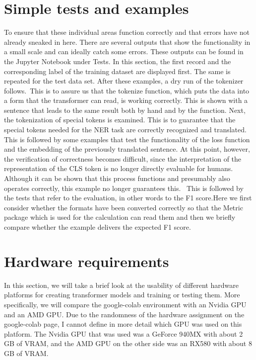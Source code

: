 \section{Simple tests and examples}
To ensure that these individual areas function correctly and that errors have not already sneaked in here. There are several outputs that show the functionality in a small scale and can ideally catch some errors. These outputs can be found in the Jupyter Notebook under Tests. In this section, the first record and the corresponding label of the training dataset are displayed first. The same is repeated for the test data set. After these examples, a dry run of the tokenizer follows. This is to assure us that the tokenize function, which puts the data into a form that the transformer can read, is working correctly. This is shown with a sentence that leads to the same result both by hand and by the function.  Next, the tokenization of special tokens is examined. This is to guarantee that the special tokens needed for the NER task are correctly recognized and translated. This is followed by some examples that test the functionality of the loss function and the embedding of the previously translated sentence. At this point, however, the verification of correctness becomes difficult, since the interpretation of the representation of the CLS token is no longer directly evaluable for humans. Although it can be shown that this process functions and presumably also operates correctly, this example no longer guarantees this.  This is followed by the tests that refer to the evaluation, in other words to the F1 score.Here we first consider whether the formats have been converted correctly so that the Metric package which is used for the calculation can read them and then we briefly compare whether the example delivers the expected F1 score. 

\section{Hardware requirements}
In this section, we will take a brief look at the usability of different hardware platforms for creating transformer models and training or testing them. More specifically, we will compare the google-colab environment with an Nvidia GPU and an AMD GPU. Due to the randomness of the hardware assignment on the google-colab page, I cannot define in more detail which GPU was used on this platform. The Nvidia GPU that was used was a GeForce 940MX with about 2 GB of VRAM, and the AMD GPU on the other side was an RX580 with about 8 GB of VRAM. 

